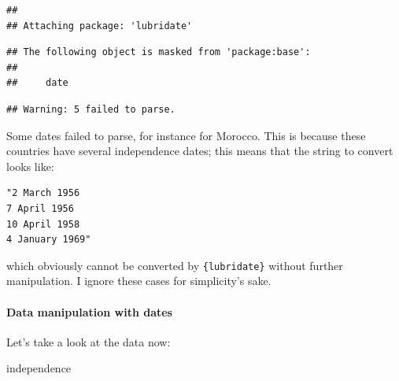 \documentclass[]{gitbook}
\newenvironment{Shaded}{\begin{snugshade}}{\end{snugshade}}
\newcommand{\DataTypeTok}[1]{\textcolor[rgb]{0.13,0.29,0.53}{#1}}
\newcommand{\KeywordTok}[1]{\textcolor[rgb]{0.13,0.29,0.53}{\textbf{#1}}}
\newcommand{\NormalTok}[1]{#1}
\newcommand{\OperatorTok}[1]{\textcolor[rgb]{0.81,0.36,0.00}{\textbf{#1}}}
\newcommand{\StringTok}[1]{\textcolor[rgb]{0.31,0.60,0.02}{#1}}
\let\oldparagraph\paragraph
\renewcommand{\paragraph}[1]{\oldparagraph{#1}\mbox{}}
\begin{document}
\begin{verbatim}
## 
## Attaching package: 'lubridate'
\end{verbatim}

\begin{verbatim}
## The following object is masked from 'package:base':
## 
##     date
\end{verbatim}

\begin{Shaded}
\end{Shaded}

\begin{verbatim}
## Warning: 5 failed to parse.
\end{verbatim}

Some dates failed to parse, for instance for Morocco. This is because these countries have several
independence dates; this means that the string to convert looks like:

\begin{verbatim}
"2 March 1956
7 April 1956
10 April 1958
4 January 1969"
\end{verbatim}

which obviously cannot be converted by \texttt{\{lubridate\}} without further manipulation. I ignore these cases for
simplicity's sake.

\hypertarget{data-manipulation-with-dates}{%
\paragraph{Data manipulation with dates}\label{data-manipulation-with-dates}}

Let's take a look at the data now:

\begin{Shaded}
\begin{Highlighting}[]
\NormalTok{independence}
\end{Highlighting}
\end{Shaded}
\end{document}
